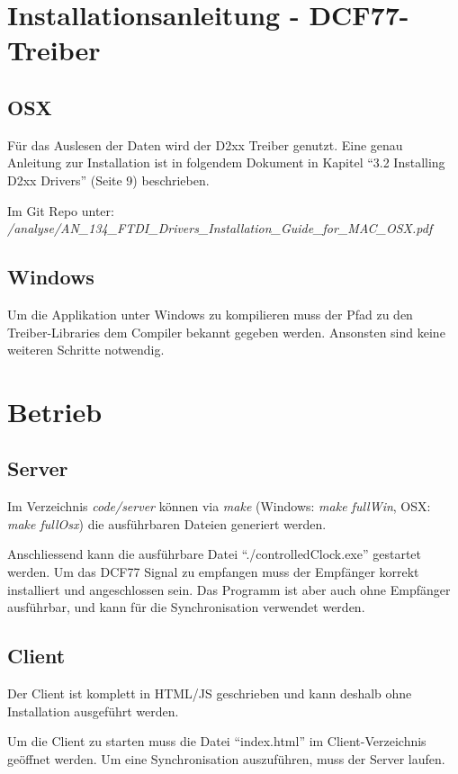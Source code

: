 \section{Installationsanleitung - DCF77-Treiber}
\subsection{OSX}
Für das Auslesen der Daten wird der D2xx Treiber genutzt. Eine genau Anleitung zur Installation ist in folgendem Dokument in Kapitel "`3.2 Installing D2xx Drivers"' (Seite 9) beschrieben.

Im Git Repo unter:\\
\textit{/analyse/AN\_134\_FTDI\_Drivers\_Installation\_Guide\_for\_MAC\_OSX.pdf}

\subsection{Windows}
Um die Applikation unter Windows zu kompilieren muss der Pfad zu den Treiber-Libraries dem Compiler bekannt gegeben werden. Ansonsten sind keine weiteren Schritte notwendig.

\section{Betrieb}
\subsection{Server}
Im Verzeichnis \textit{code/server} können via \textit{make} (Windows: \textit{make fullWin}, OSX: \textit{make fullOsx}) die ausführbaren Dateien generiert werden.

Anschliessend kann die ausführbare Datei "`./controlledClock.exe"' gestartet werden. Um das DCF77 Signal zu empfangen muss der Empfänger korrekt installiert und angeschlossen sein. Das Programm ist aber auch ohne Empfänger ausführbar, und kann für die Synchronisation verwendet werden.

\subsection{Client}
Der Client ist komplett in HTML/JS geschrieben und kann deshalb ohne Installation ausgeführt werden. 

Um die Client zu starten muss die Datei "`index.html"' im Client-Verzeichnis geöffnet werden. Um eine Synchronisation auszuführen, muss der Server laufen.

